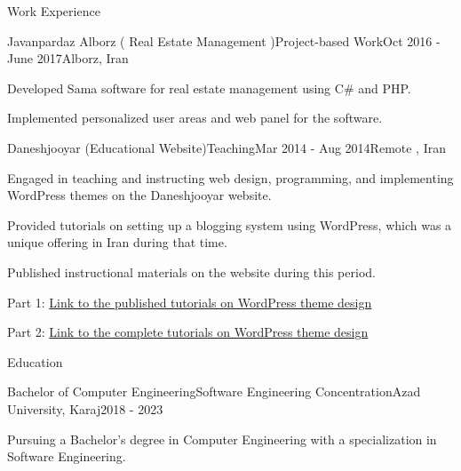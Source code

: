 \documentclass[]{kyvernitis-resume}
\begin{document}
\begin{section}{Work Experience}
\begin{subsection}{Javanpardaz Alborz ( Real Estate Management )}{Project-based Work}{Oct 2016 - June 2017}{Alborz, Iran}
\item Developed Sama software for real estate management using C\# and PHP.
\item Implemented personalized user areas and web panel for the software.
\end{subsection}


 \begin{subsection}{Daneshjooyar (Educational Website)}{Teaching}{Mar 2014 - Aug 2014}{Remote , Iran}
	\item Engaged in teaching and instructing web design, programming, and implementing WordPress themes on the Daneshjooyar website.
	\item Provided tutorials on setting up a blogging system using WordPress, which was a unique offering in Iran during that time.
	\item Published instructional materials on the website during this period.
	\item Part 1:  \href{https://www.daneshjooyar.com/%d9%82%d8%b3%d9%85%d8%aa-%d9%86%d9%87%d8%a7%db%8c%db%8c-%d8%b3%d8%b1%db%8c-%d8%a2%d9%85%d9%88%d8%b2%d8%b4%db%8c-%d8%b7%d8%b1%d8%a7%d8%ad%db%8c-%d9%82%d8%a7%d9%84%d8%a8-%d9%88%d8%b1%d8%af%d9%be%d8%b1/}{Link to the published tutorials on WordPress theme design} 
	\item Part 2: \href{https://www.daneshjooyar.com/%d8%a2%d9%85%d9%88%d8%b2%d8%b4-%d8%b7%d8%b1%d8%a7%d8%ad%db%8c-%d9%82%d8%a7%d9%84%d8%a8-%d9%88%d8%b1%d8%af%d9%be%d8%b1%d8%b3-%d8%aa%d9%85%d8%a7%d9%85%db%8c-%d9%82%d8%b3%d9%85%d8%aa-%d9%87%d8%a7-%d9%82/}{Link to the complete tutorials on WordPress theme design}
    \end{subsection}
    
\end{section}

\begin{section}{Education}

\begin{subsectionnobullet}{Bachelor of Computer Engineering}{Software Engineering Concentration}{Azad University, Karaj}{2018 - 2023}
\item Pursuing a Bachelor's degree in Computer Engineering with a specialization in Software Engineering.
\end{subsectionnobullet}

\end{section}
\end{document}
